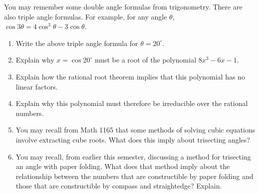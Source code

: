 \documentclass[nooutcomes]{ximera}
\begin{document}
\begin{problem}
You may remember some double angle formulas from trigonometry.  There are also triple angle formulas.  For example, for any angle $\theta$,  
$\cos3\theta=4\cos^3\theta -3\cos\theta$.  
\begin{enumerate}
\item Write the above triple angle formula for $\theta = 20^\circ$.  %
\item Explain why $x = \cos20^\circ$ must be a root of the polynomial $8x^3-6x-1$.  
\item Explain how the rational root theorem implies that this polynomial has no linear factors.  
\item Explain why this polynomial must therefore be irreducible over the rational numbers.  
\item You may recall from Math 1165 that some methods of solving cubic equations involve extracting cube roots.  What does this imply about trisecting angles?  
\item You may recall, from earlier this semester, discussing a method for trisecting an angle with paper folding.  What does that method imply about the relationship between the numbers that are constructible by paper folding and those that are constructible by compass and straightedge?  Explain.  
\end{enumerate}
\vfill
\end{problem}
\end{document}
